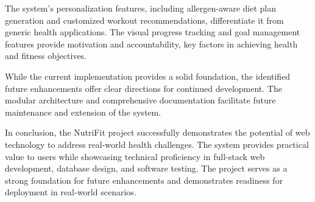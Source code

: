 The system's personalization features, including allergen-aware diet plan generation and customized workout recommendations, differentiate it from generic health applications. The visual progress tracking and goal management features provide motivation and accountability, key factors in achieving health and fitness objectives.

While the current implementation provides a solid foundation, the identified future enhancements offer clear directions for continued development. The modular architecture and comprehensive documentation facilitate future maintenance and extension of the system.

In conclusion, the NutriFit project successfully demonstrates the potential of web technology to address real-world health challenges. The system provides practical value to users while showcasing technical proficiency in full-stack web development, database design, and software testing. The project serves as a strong foundation for future enhancements and demonstrates readiness for deployment in real-world scenarios.

